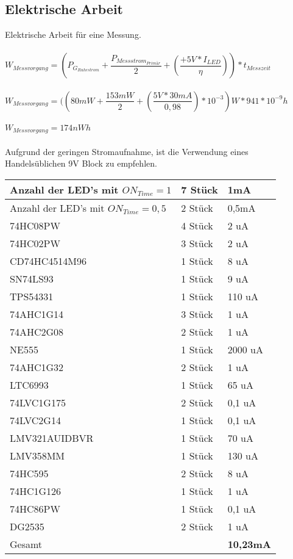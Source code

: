 \subsection{Elektrische Arbeit}

Elektrische Arbeit für eine Messung.
\\
\\
$W_{Messvorgang} = (P_{G_{Ruhestrom}} + \dfrac{P_{Messstrom_{Primär}}}{2} + (\dfrac{+5V * I_{LED}}{\eta})) * t_{Messzeit}$
\\
\\
$W_{Messvorgang} = ((80mW + \dfrac{153mW}{2} + (\dfrac{5V * 30mA}{0,98})*10^{-3})W * 941 * 10^{-9}h$
\\
\\
$W_{Messvorgang} = 174nWh$
\\
\\
Aufgrund der geringen Stromaufnahme, ist die Verwendung eines Handelsüblichen 9V Block zu empfehlen.

\newpage
\renewcommand{\arraystretch}{2}
\begin{tabularx}{\textwidth}{p{}| p{} | p{}}
Anzahl der LED's mit  $ON_{Time} = 1$			&	7 Stück		&	1mA 		\\
\hline
Anzahl der LED's mit  $ON_{Time} = 0,5	$	&	2 Stück		&	0,5mA 		\\
\hline
74HC08PW								&	4 Stück		&	2 uA		\\
\hline
74HC02PW								&	3 Stück		&	2 uA		\\
\hline
CD74HC4514M96							&	1 Stück		&	8 uA		\\
\hline
SN74LS93								&	1 Stück		&	9 uA		\\
\hline
TPS54331								&	1 Stück		&	110 uA		\\
\hline
74AHC1G14								&	3 Stück		&	1 uA		\\
\hline
74AHC2G08								&	2 Stück		&	1 uA		\\
\hline
NE555									&	1 Stück		&	2000 uA		\\
\hline
74AHC1G32								&	2 Stück		&	1 uA		\\
\hline
LTC6993									&	1 Stück		&	65 uA		\\
\hline
74LVC1G175								&	2 Stück		&	0,1 uA		\\
\hline
74LVC2G14								&	1 Stück		&	0,1 uA		\\
\hline
LMV321AUIDBVR							&	1 Stück		&	70 uA		\\
\hline
LMV358MM								&	1 Stück		&	130 uA		\\
\hline
74HC595									&	2 Stück		&	8 uA		\\
\hline
74HC1G126								&	1 Stück		&	1 uA		\\
\hline
74HC86PW								&	1 Stück		&	0,1 uA		\\
\hline
DG2535									&	2 Stück		&	1 uA		\\
\hline 
Gesamt									&				&	\textbf{10,23mA} \\
\end{tabularx}
\renewcommand{\arraystretch}{1}

